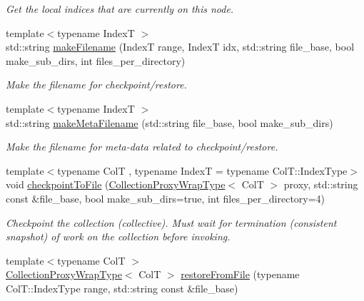 \begin{DoxyCompactItemize}
\begin{DoxyCompactList}\small\item\em Get the local indices that are currently on this node. \end{DoxyCompactList}\item 
{\footnotesize template$<$typename IndexT $>$ }\\std\+::string \hyperlink{structvt_1_1vrt_1_1collection_1_1_collection_manager_ae8d3db4274a1239fa0097dae11e93bb9}{make\+Filename} (IndexT range, IndexT idx, std\+::string file\+\_\+base, bool make\+\_\+sub\+\_\+dirs, int files\+\_\+per\+\_\+directory)
\begin{DoxyCompactList}\small\item\em Make the filename for checkpoint/restore. \end{DoxyCompactList}\item 
{\footnotesize template$<$typename IndexT $>$ }\\std\+::string \hyperlink{structvt_1_1vrt_1_1collection_1_1_collection_manager_abe41e7e9c9dec081a79b222b4c5dc199}{make\+Meta\+Filename} (std\+::string file\+\_\+base, bool make\+\_\+sub\+\_\+dirs)
\begin{DoxyCompactList}\small\item\em Make the filename for meta-\/data related to checkpoint/restore. \end{DoxyCompactList}\item 
{\footnotesize template$<$typename ColT , typename IndexT  = typename Col\+T\+::\+Index\+Type$>$ }\\void \hyperlink{structvt_1_1vrt_1_1collection_1_1_collection_manager_af3771d408c2ef15e65b9ba8219aa830a}{checkpoint\+To\+File} (\hyperlink{structvt_1_1vrt_1_1collection_1_1_collection_manager_a56458ed7f9bb22b631b9b3a745f42f94}{Collection\+Proxy\+Wrap\+Type}$<$ ColT $>$ proxy, std\+::string const \&file\+\_\+base, bool make\+\_\+sub\+\_\+dirs=true, int files\+\_\+per\+\_\+directory=4)
\begin{DoxyCompactList}\small\item\em Checkpoint the collection (collective). Must wait for termination (consistent snapshot) of work on the collection before invoking. \end{DoxyCompactList}\item 
{\footnotesize template$<$typename ColT $>$ }\\\hyperlink{structvt_1_1vrt_1_1collection_1_1_collection_manager_a56458ed7f9bb22b631b9b3a745f42f94}{Collection\+Proxy\+Wrap\+Type}$<$ ColT $>$ \hyperlink{structvt_1_1vrt_1_1collection_1_1_collection_manager_a315a74b9299f31ebc5e3e4becdd9f79e}{restore\+From\+File} (typename Col\+T\+::\+Index\+Type range, std\+::string const \&file\+\_\+base)

\end{DoxyCompactItemize}
